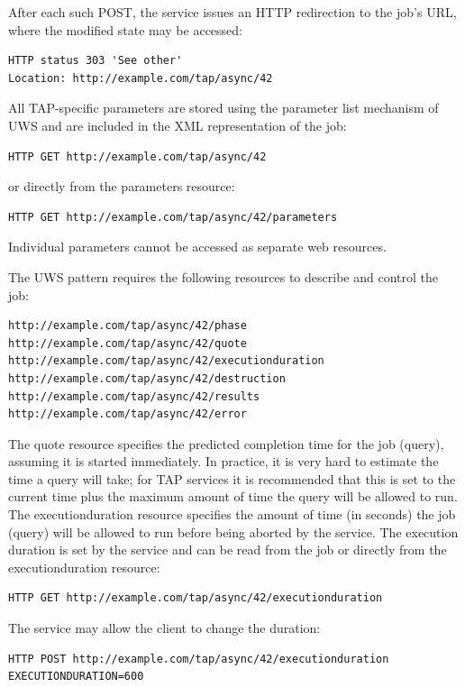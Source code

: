 \documentclass[11pt,letter]{ivoa}
\begin{document}
After each such POST, the service issues an HTTP redirection to the job's URL, 
where the modified state may be accessed:

\begin{verbatim}
HTTP status 303 'See other'
Location: http://example.com/tap/async/42
\end{verbatim}

All TAP-specific parameters are stored using the parameter list mechanism of 
UWS and are included in the XML representation of the job:
\begin{verbatim}
HTTP GET http://example.com/tap/async/42
\end{verbatim}
or directly from the parameters resource:
\begin{verbatim}
HTTP GET http://example.com/tap/async/42/parameters
\end{verbatim}
Individual parameters cannot be accessed as separate web resources.

The UWS pattern requires the following resources to describe and control the 
job:
\begin{verbatim}
http://example.com/tap/async/42/phase
http://example.com/tap/async/42/quote
http://example.com/tap/async/42/executionduration
http://example.com/tap/async/42/destruction
http://example.com/tap/async/42/results
http://example.com/tap/async/42/error
\end{verbatim}
The quote resource specifies the predicted completion time for the job (query), 
assuming it is started immediately. In practice, it is very hard to estimate the 
time a query will take; for TAP services it is recommended that this is set to 
the current time plus the maximum amount of time the query will be allowed to 
run. The executionduration resource specifies the amount of time (in seconds) 
the job (query) will be allowed to run before being aborted by the service. The 
execution duration is set by the service and can be read from the job or 
directly from the executionduration resource:

\begin{verbatim}
HTTP GET http://example.com/tap/async/42/executionduration
\end{verbatim}
The service may allow the client to change the duration:
\begin{verbatim}
HTTP POST http://example.com/tap/async/42/executionduration
EXECUTIONDURATION=600
\end{verbatim}
\end{document}
